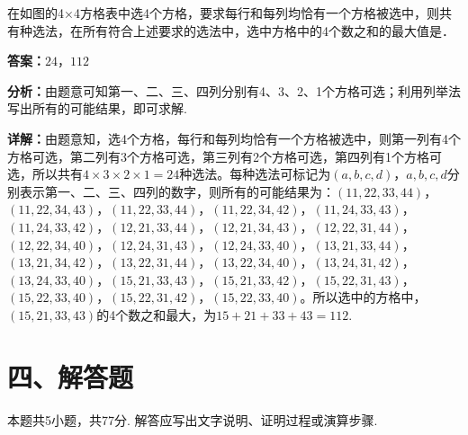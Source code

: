 \begin{question}[points=5]
在如图的4×4方格表中选4个方格，要求每行和每列均恰有一个方格被选中，则共有种选法，在所有符合上述要求的选法中，选中方格中的4个数之和的最大值是．
\fillin[{$24$，$112$}]
\begin{solution}
\textbf{答案：}$24$，$112$

\textbf{分析：}由题意可知第一、二、三、四列分别有4、3、2、1个方格可选；利用列举法写出所有的可能结果，即可求解.

\textbf{详解：}由题意知，选4个方格，每行和每列均恰有一个方格被选中，则第一列有4个方格可选，第二列有3个方格可选，第三列有2个方格可选，第四列有1个方格可选，所以共有$4\times3\times2\times1=24$种选法。每种选法可标记为$(a,b,c,d)$，$a,b,c,d$分别表示第一、二、三、四列的数字，则所有的可能结果为：$(11,22,33,44)$，$(11,22,34,43)$，$(11,22,33,44)$，$(11,22,34,42)$，$(11,24,33,43)$，$(11,24,33,42)$，$(12,21,33,44)$，$(12,21,34,43)$，$(12,22,31,44)$，$(12,22,34,40)$，$(12,24,31,43)$，$(12,24,33,40)$，$(13,21,33,44)$，$(13,21,34,42)$，$(13,22,31,44)$，$(13,22,34,40)$，$(13,24,31,42)$，$(13,24,33,40)$，$(15,21,33,43)$，$(15,21,33,42)$，$(15,22,31,43)$，$(15,22,33,40)$，$(15,22,31,42)$，$(15,22,33,40)$。所以选中的方格中，$(15,21,33,43)$的4个数之和最大，为$15+21+33+43=112$.
\end{solution}
\end{question}

\section*{四、解答题}
本题共5小题，共77分. 解答应写出文字说明、证明过程或演算步骤.

